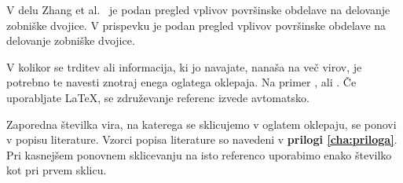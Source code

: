 V delu Zhang et al.~\cite{zhang2025} je podan pregled vplivov površinske obdelave na delovanje zobniške dvojice. V prispevku \cite{zhang2025} je podan pregled vplivov površinske obdelave na delovanje zobniške dvojice.

V kolikor se trditev ali informacija, ki jo navajate, nanaša na več virov, je potrebno te navesti znotraj enega oglatega oklepaja. Na primer \cite{grote2021,bower2025}, \cite{grote2021,bower2025,stephan2021,tsao1993} ali \cite{grote2021,stephan2021,zhang2025,zibert2025,niculuta2012,gyroid,dawkins,znidarsic2025,merkur2005,surs2009,zgd1,iso690}. Če uporabljate LaTeX, se združevanje referenc izvede avtomatsko.

Zaporedna številka vira, na katerega se sklicujemo v oglatem oklepaju, se ponovi v popisu literature. Vzorci popisa literature so navedeni v \textbf{prilogi \ref{cha:priloga}}. Pri kasnejšem ponovnem sklicevanju na isto referenco uporabimo enako številko kot pri prvem sklicu.
